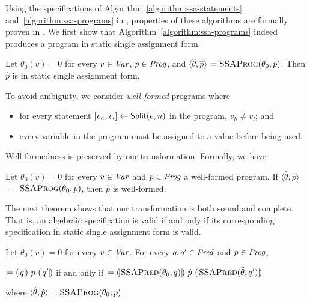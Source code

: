 Using the specifications of Algorithm~\ref{algorithm:ssa-statements}
and~\ref{algorithm:ssa-programs} in \gallina, properties of these
algorithms are formally proven in \coq. We first show that
Algorithm~\ref{algorithm:ssa-programs} indeed 
produces a program in static single assignment form.
\begin{lemma}
  Let $\theta_0(v) = 0$ for every $v \in \mathit{Var}$, $p \in \mathit{Prog}$, and
  $\langle \hat{\theta}, \hat{p} \rangle$ $=
  \textsc{SSAProg}(\theta_0, p)$. Then
  $\hat{p}$ is in static single assignment form.
  \label{lemma:ssa-programs}
\end{lemma}

To avoid ambiguity, we consider \emph{well-formed} programs where
\begin{itemize}
\item for every statement ${[}{v_h}, {v_l}{]} \leftarrow
  \mbox{\textsf{Split}}(e, n)$ in the program, $v_h \neq v_l$; and
\item every variable in the program must be assigned to a value
  before being used. 
\end{itemize}
Well-formedness is preserved by our transformation. Formally, we have
\begin{lemma}
  Let $\theta_0(v) = 0$ for every $v \in \mathit{Var}$ and $p \in \mathit{Prog}$ a
  well-formed program. If $\langle \hat{\theta}, \hat{p} \rangle$ $=$ 
  $\textsc{SSAProg}(\theta_0, p)$, then $\hat{p}$ is well-formed.
  \label{lemma:ssa-well-formed}
\end{lemma}

The next theorem shows that our transformation is both sound and
complete. That is, an algebraic specification is valid if and only if its
corresponding specification in static single assignment form is valid.
\begin{theorem}
  Let $\theta_0(v) = 0$ for every $v \in \mathit{Var}$. For every $q, q' \in \mathit{Pred}$
  and $p \in \mathit{Prog}$,
  \begin{center}
    $\models {(\!|}{q}{|\!)}~{p}~{(\!|}{q'}{|\!)}$ if and only if
    $\models {(\!|}{\textsc{SSAPred}(\theta_0, q)}{|\!)}~{\hat{p}}~{(\!|}{\textsc{SSAPred}(\hat{\theta}, q')}{|\!)}$
  \end{center}
  where $\langle \hat{\theta}, \hat{p} \rangle =
  \textsc{SSAProg}(\theta_0, p)$.
  \label{theorem:ssa}
\end{theorem}

